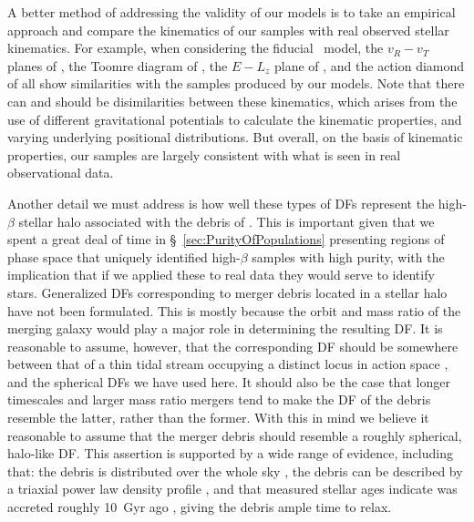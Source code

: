 A better method of addressing the validity of our models is to take an empirical approach and compare the kinematics of our samples with real observed stellar kinematics. For example, when considering the fiducial \survey\ model, the $v_{R}-v_{T}$ planes of \textcite{belokurov18,fattahi19,naidu20}, the Toomre diagram of \textcite{helmi18,koppelman19b}, the $E-L_{z}$ plane of \textcite{helmi18,koppelman19b,naidu20}, and the action diamond of \parencite[normalized to be a circle, ][]{naidu20} all show similarities with the samples produced by our models. Note that there can and should be disimilarities between these kinematics, which arises from the use of different gravitational potentials to calculate the kinematic properties, and varying underlying positional distributions. But overall, on the basis of kinematic properties, our samples are largely consistent with what is seen in real observational data.

Another detail we must address is how well these types of DFs represent the high-$\beta$ stellar halo associated with the debris of \gse. This is important given that we spent a great deal of time in \S~\ref{sec:PurityOfPopulations} presenting regions of phase space that uniquely identified high-$\beta$ samples with high purity, with the implication that if we applied these to real data they would serve to identify \gse stars. Generalized DFs corresponding to merger debris located in a stellar halo have not been formulated. This is mostly because the orbit and mass ratio of the merging galaxy would play a major role in determining the resulting DF. It is reasonable to assume, however, that the corresponding DF should be somewhere between that of a thin tidal stream occupying a distinct locus in action space \parencite[e.g.][]{bovy14}, and the spherical DFs we have used here. It should also be the case that longer timescales and larger mass ratio mergers tend to make the DF of the debris resemble the latter, rather than the former. With this in mind we believe it reasonable to assume that the \gse merger debris should resemble a roughly spherical, halo-like DF. This assertion is supported by a wide range of evidence, including that: the \gse debris is distributed over the whole sky \parencite[see Figure 12 in ][]{helmi20}, the \gse debris can be described by a triaxial power law density profile \parencite{mackereth20}, and that measured stellar ages indicate \gse was accreted roughly 10~Gyr ago \parencite{montalban21}, giving the debris ample time to relax.

